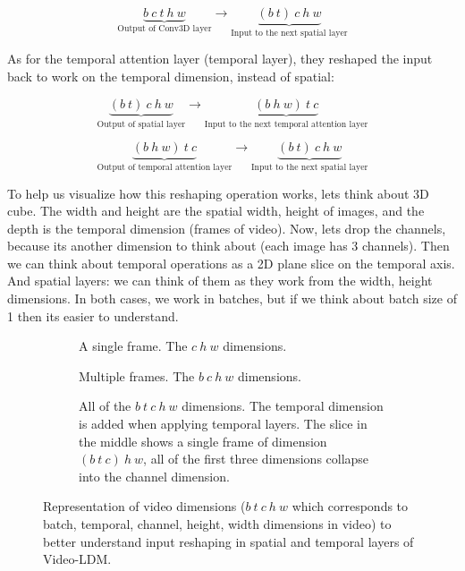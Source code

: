 \[ \underbrace{b\ c\ t\ h\ w}_{\text{Output of Conv3D layer}} \rightarrow \underbrace{(b\ t)\ c\ h\ w}_{\text{Input to the next spatial layer}} \]

As for the temporal attention layer (temporal layer), they reshaped the input back to work on the temporal dimension, instead of spatial:

\[ \underbrace{(b\ t)\ c\ h\ w}_{\text{Output of spatial layer}} \rightarrow \underbrace{(b\ h\ w) \ t\ c}_{\text{Input to the next temporal attention layer}} \]

\[ \underbrace{(b\ h\ w) \ t\ c}_{\text{Output of temporal attention layer}} \rightarrow \underbrace{(b\ t)\ c\ h\ w}_{\text{Input to the next spatial layer}} \]

To help us visualize how this reshaping operation works, lets think about 3D cube. The width and height are the spatial width, height of images, and the depth is the temporal dimension (frames of video). Now, lets drop the channels, because its another dimension to think about (each image has 3 channels). Then we can think about temporal operations as a 2D plane slice on the temporal axis. And spatial layers: we can think of them as they work from the width, height dimensions. In both cases, we work in batches, but if we think about batch size of 1 then its easier to understand.

\begin{figure}
    \centering

    \begin{subfigure}{0.3\textwidth}
        \centering
        \scalebox{0.6}{
            
        }
        \caption{A single frame. The $c\ h\ w$ dimensions.}
    \end{subfigure}

    \begin{subfigure}{0.3\textwidth}
        \centering
        \scalebox{0.6}{
            
        }
        \caption{Multiple frames. The $b\ c\ h\ w$ dimensions.}
    \end{subfigure}

    \begin{subfigure}{0.7\textwidth}
        \centering
        \scalebox{0.6}{
            
        }
        \caption{All of the $b\ t\ c\ h\ w$ dimensions. The temporal dimension is added when applying temporal layers. The slice in the middle shows a single frame of dimension $(b\ t\ c)\ h\ w$, all of the first three dimensions collapse into the channel dimension.}
    \end{subfigure}

    \caption{Representation of video dimensions ($b\ t\ c\ h\ w$ which corresponds to batch, temporal, channel, height, width dimensions in video) to better understand input reshaping in spatial and temporal layers of Video-LDM.}
\end{figure}





